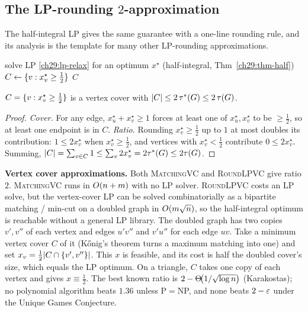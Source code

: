 \subsection{The LP-rounding $2$-approximation}

The half-integral LP gives the same guarantee with a one-line rounding rule, and
its analysis is the template for many other LP-rounding approximations.

\begin{algorithm}[H]
\caption{\textsc{RoundLPVC}$(\Gph)$ -- LP rounding}
\label{ch29:alg-lpvc}
\DontPrintSemicolon
solve LP \eqref{ch29:lp-relax} for an optimum $x^\star$ (half-integral, Thm~\ref{ch29:thm-half})\;
$C\leftarrow\{v: x^\star_v\ge \tfrac12\}$\;
\Return $C$\;
\end{algorithm}

\begin{lemma}
\label{ch29:lem-lpvc}
$C=\{v:x^\star_v\ge\tfrac12\}$ is a vertex cover with
$\lvert C\rvert\le 2\,\tau^*(G)\le 2\,\tau(G)$.
\end{lemma}

\begin{proof}
\emph{Cover.} For any edge, $x^\star_u+x^\star_v\ge1$ forces at least one of
$x^\star_u,x^\star_v$ to be $\ge\tfrac12$, so at least one endpoint is in $C$.
\emph{Ratio.} Rounding $x^\star_v\ge\tfrac12$ up to $1$ at most doubles its
contribution: $1\le 2x^\star_v$ when $x^\star_v\ge\tfrac12$, and vertices with
$x^\star_v<\tfrac12$ contribute $0\le 2x^\star_v$. Summing,
$\lvert C\rvert=\sum_{v\in C}1\le\sum_v 2x^\star_v=2\tau^*(G)\le2\tau(G)$.
\end{proof}

\begin{complexitybox}
\textbf{Vertex cover approximations.} Both \textsc{MatchingVC} and
\textsc{RoundLPVC} give ratio $2$. \textsc{MatchingVC} runs in $O(n+m)$ with no
LP solver. \textsc{RoundLPVC} costs an LP solve, but the vertex-cover LP can be
solved combinatorially as a bipartite matching / min-cut on a doubled graph in
$O(m\sqrt n)$, so the half-integral optimum is reachable without a general LP
library. The doubled graph has two copies $v',v''$ of each vertex and edges
$u'v''$ and $v'u''$ for each edge $uv$. Take a minimum vertex cover $C$ of it
(K\H{o}nig's theorem turns a maximum matching into one) and set
$x_v=\tfrac12\lvert C\cap\{v',v''\}\rvert$. This $x$ is feasible, and its cost is half
the doubled cover's size, which equals the LP optimum. On a triangle, $C$ takes
one copy of each vertex and gives $x\equiv\tfrac12$. The best known ratio is $2-\Theta\!\big(1/\sqrt{\log n}\big)$ (Karakostas);
no polynomial algorithm beats $1.36$ unless P${}={}$NP, and none beats $2-\varepsilon$
under the Unique Games Conjecture.
\end{complexitybox}


